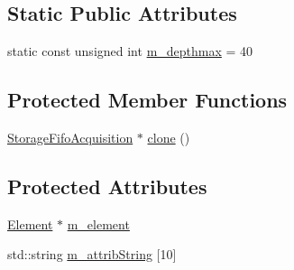 \subsection*{Static Public Attributes}
\begin{DoxyCompactItemize}
\item 
static const unsigned int \hyperlink{classStorageFifoAcquisition_a2f3ce0569ee9ec4fa78ec66a9cbe6ed7}{m\_\-depthmax} = 40
\end{DoxyCompactItemize}
\subsection*{Protected Member Functions}
\begin{DoxyCompactItemize}
\item 
\hyperlink{classStorageFifoAcquisition_1_1StorageFifoAcquisition}{StorageFifoAcquisition} $\ast$ \hyperlink{classStorageFifoAcquisition_aab797010fd3efe7ef2c4a6e6ba4e87c2}{clone} ()
\end{DoxyCompactItemize}
\subsection*{Protected Attributes}
\begin{DoxyCompactItemize}
\item 
\hyperlink{classElement}{Element} $\ast$ \hyperlink{classProcessus_aa9d24d53c3e52f36786cabb5d8e296e7}{m\_\-element}
\item 
std::string \hyperlink{classAttrib_a3414521d7a82476e874b25a5407b5e63}{m\_\-attribString} \mbox{[}10\mbox{]}
\end{DoxyCompactItemize}

